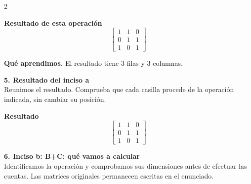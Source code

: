 \documentclass[11pt,a4paper,landscape]{article}
\begin{document}
\begin{multicols*}{2}
\begin{minipage}{\linewidth}
\par{}\par\smallskip
\par\smallskip \textbf{Resultado de esta operación}\[\begin{bmatrix}1 & 1 & 0\\0 & 1 & 1\\1 & 0 & 1\end{bmatrix}\]
\par\smallskip\textbf{Qué aprendimos.} El resultado tiene 3 filas y 3 columnas.
\end{minipage}\par\medskip
\noindent\begin{minipage}{\linewidth}\textbf{5. Resultado del inciso a}\\[2pt]Reunimos el resultado. Comprueba que cada casilla procede de la operación indicada, sin cambiar su posición.
\par\smallskip \textbf{Resultado}\[\begin{bmatrix}1 & 1 & 0\\0 & 1 & 1\\1 & 0 & 1\end{bmatrix}\]
\end{minipage}\par\medskip
\noindent\begin{minipage}{\linewidth}\textbf{6. Inciso b: B+C: qué vamos a calcular}\\[2pt]Identificamos la operación y comprobamos sus dimensiones antes de efectuar las cuentas. Las matrices originales permanecen escritas en el enunciado.

\end{minipage}
\end{multicols*}
\end{document}
